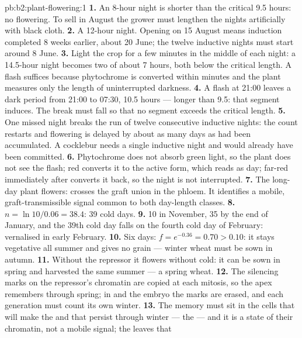 \begin{solution}{pb:b2:plant-flowering:1}
\textbf{1.} An 8-hour night is shorter than the critical 9.5 hours:
no flowering. To sell in August the grower must lengthen the nights
artificially with black cloth.
\textbf{2.} A 12-hour night. Opening on 15 August means induction
completed 8 weeks earlier, about 20 June; the twelve inductive
nights must start around 8 June.
\textbf{3.} Light the crop for a few minutes in the middle of each
night: a 14.5-hour night becomes two of about 7 hours, both below
the critical length. A flash suffices because phytochrome is
converted within minutes and the plant measures only the length of
uninterrupted darkness.
\textbf{4.} A flash at 21:00 leaves a dark period from
21:00 to 07:30, 10.5 hours --- longer than 9.5:
that segment induces. The break must fall so that no segment exceeds
the critical length.
\textbf{5.} One missed night breaks the run of twelve consecutive
inductive nights: the count restarts and flowering is delayed by
about as many days as had been accumulated. A cocklebur needs a
single inductive night and would already have been committed.
\textbf{6.} Phytochrome does not absorb green light, so the plant
does not see the flash; red converts it to the active form, which
reads as day; far-red immediately after converts it back, so the
night is not interrupted.
\textbf{7.} The long-day plant flowers:  crosses the graft
union in the phloem. It identifies a mobile, graft-transmissible
signal common to both day-length classes.
\textbf{8.} $n = \ln 10/0.06 = 38.4$: 39 cold days.
\textbf{9.} 10 in November, 35 by the end of January, and the 39th
cold day falls on the fourth cold day of February: vernalised in
early February.
\textbf{10.} Six days: $f = e^{-0.36} = 0.70 > 0.10$: it stays
vegetative all summer and gives no grain --- winter wheat must be
sown in autumn.
\textbf{11.} Without the repressor it flowers without cold: it can
be sown in spring and harvested the same summer --- a spring wheat.
\textbf{12.} The silencing marks on the repressor's chromatin are
copied at each mitosis, so the apex remembers through spring; in
 and the embryo the marks are erased, and each generation
must count its own winter.
\textbf{13.} The memory must sit in the cells that will make the
 and that persist through winter --- the  --- and it
is a state of their chromatin, not a mobile signal; the leaves that

\end{solution}
